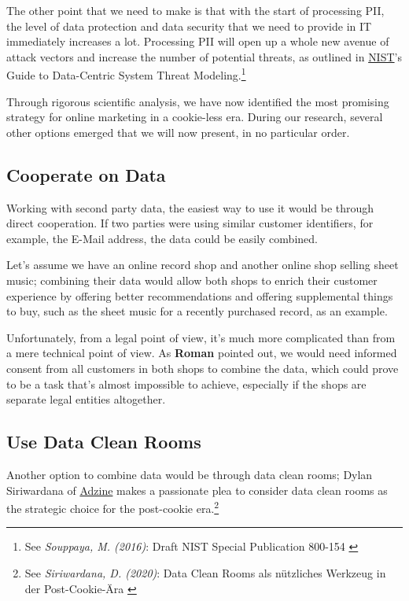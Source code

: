 The other point that we need to make is that with the start of processing PII, the level of data protection and data security that we need to provide in IT immediately increases a lot. Processing PII will open up a whole new avenue of attack vectors and increase the number of potential threats, as outlined in \href{https://www.nist.gov/}{NIST}'s Guide to Data-Centric System Threat Modeling.\footnote{See \textit{Souppaya, M. (2016)}: Draft NIST Special Publication 800-154 \cite{sp800_154_draft}}

Through rigorous scientific analysis, we have now identified the most promising strategy for online marketing in a cookie-less era. During our research, several other options emerged that we will now present, in no particular order.

\subsection{Cooperate on Data}

Working with second party data, the easiest way to use it would be through direct cooperation. If two parties were using similar customer identifiers, for example, the E-Mail address, the data could be easily combined. 

Let's assume we have an online record shop and another online shop selling sheet music; combining their data would allow both shops to enrich their customer experience by offering better recommendations and offering supplemental things to buy, such as the sheet music for a recently purchased record, as an example.

Unfortunately, from a legal point of view, it's much more complicated than from a mere technical point of view. As \textbf{Roman} pointed out, we would need informed consent from all customers in both shops to combine the data, which could prove to be a task that's almost impossible to achieve, especially if the shops are separate legal entities altogether.

\subsection{Use Data Clean Rooms}

Another option to combine data would be through data clean rooms; Dylan Siriwardana of \href{https://www.adzine.de/}{Adzine} makes a passionate plea to consider data clean rooms as the strategic choice for the post-cookie era.\footnote{See \textit{Siriwardana, D. (2020)}: Data Clean Rooms als nützliches Werkzeug in der Post-Cookie-Ära \cite{dataClean}}

